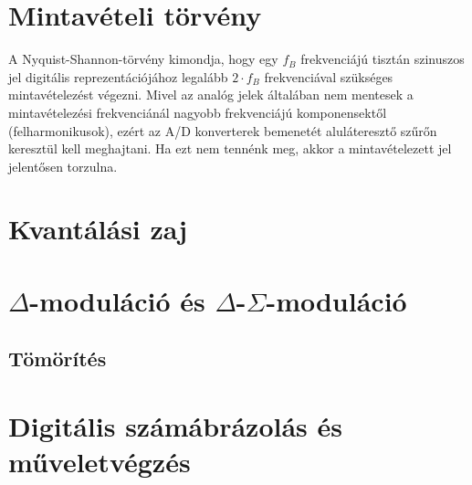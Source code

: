 \documentclass[12pt]{article}
\theoremstyle{plain}
\begin{document}
\section{Mintavételi törvény}

A Nyquist-Shannon-törvény kimondja, hogy egy $f_B$ frekvenciájú
tisztán szinuszos jel digitális reprezentációjához legalább $2 \cdot f_B$ frekvenciával szükséges mintavételezést végezni. Mivel az analóg jelek általában nem mentesek a mintavételezési frekvenciánál nagyobb frekvenciájú komponensektől (felharmonikusok), ezért az A/D konverterek bemenetét aluláteresztő szűrőn keresztül kell meghajtani. Ha ezt nem tennénk meg, akkor a mintavételezett jel jelentősen torzulna.



\section{Kvantálási zaj}



\section{$\Delta$-moduláció és $\Delta$-$\Sigma$-moduláció}

\subsection{Tömörítés}


\section{Digitális számábrázolás és műveletvégzés}





\end{document}
